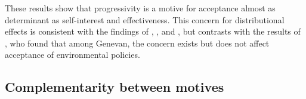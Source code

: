 \documentclass[12pt]{article} %
\begin{document}

These results show that progressivity is a motive for acceptance almost as determinant as self-interest and effectiveness. This concern for distributional effects is consistent with the findings of \citet{kallbekken_saelen_2011}, \citet{brannlund_tax_2012}, and \citet{gevrek_public_2015}, but contrasts with the results of \citet{baranzini_effectiveness_2017}, who found that among Genevan, the concern exists but does not affect acceptance of environmental policies.

\subsection{Complementarity between motives}

\end{document}
